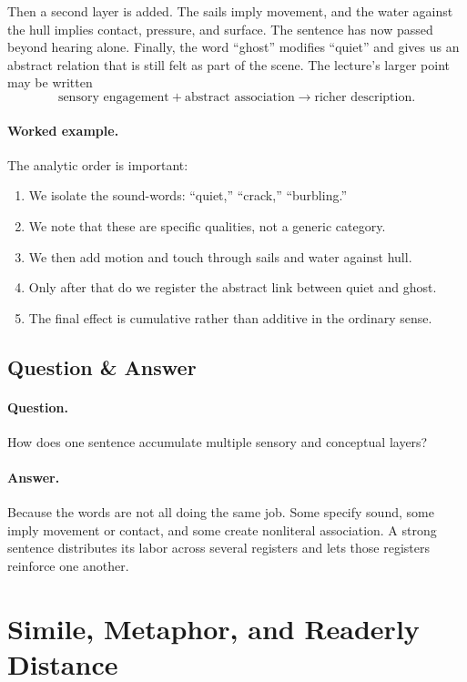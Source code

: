 Then a second layer is added. The sails imply movement, and the water against the hull implies contact, pressure, and surface. The sentence has now passed beyond hearing alone. Finally, the word ``ghost'' modifies ``quiet'' and gives us an abstract relation that is still felt as part of the scene. The lecture's larger point may be written
\begin{equation}
\text{sensory engagement} + \text{abstract association} \to \text{richer description}.
\end{equation}

\paragraph{Worked example.} The analytic order is important:
\begin{enumerate}
\item We isolate the sound-words: ``quiet,'' ``crack,'' ``burbling.''
\item We note that these are specific qualities, not a generic category.
\item We then add motion and touch through sails and water against hull.
\item Only after that do we register the abstract link between quiet and ghost.
\item The final effect is cumulative rather than additive in the ordinary sense.
\end{enumerate}

\subsection{Question \& Answer}

\paragraph{Question.} How does one sentence accumulate multiple sensory and conceptual layers?

\paragraph{Answer.} Because the words are not all doing the same job. Some specify sound, some imply movement or contact, and some create nonliteral association. A strong sentence distributes its labor across several registers and lets those registers reinforce one another.

\section{Simile, Metaphor, and Readerly Distance}

